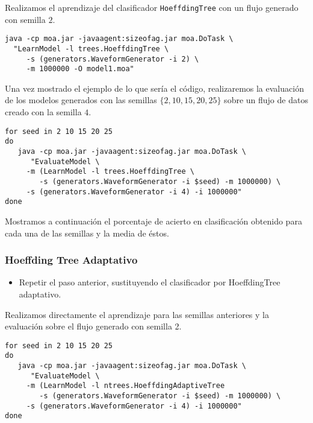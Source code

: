 \documentclass[11pt]{article}
\begin{document}
Realizamos el aprendizaje del clasificador \texttt{HoeffdingTree} con un flujo
generado con semilla \(2\).

\begin{verbatim}
java -cp moa.jar -javaagent:sizeofag.jar moa.DoTask \
  "LearnModel -l trees.HoeffdingTree \
     -s (generators.WaveformGenerator -i 2) \
     -m 1000000 -O model1.moa"
\end{verbatim}



Una vez mostrado el ejemplo de lo que sería el código, realizaremos la
evaluación de los modelos generados con las semillas
\(\{2,10,15,20,25\}\) sobre un flujo de datos creado con la semilla \(4\).

\begin{verbatim}
for seed in 2 10 15 20 25
do
   java -cp moa.jar -javaagent:sizeofag.jar moa.DoTask \
      "EvaluateModel \
	 -m (LearnModel -l trees.HoeffdingTree \
	    -s (generators.WaveformGenerator -i $seed) -m 1000000) \
	 -s (generators.WaveformGenerator -i 4) -i 1000000"
done
\end{verbatim}

Mostramos a continuación el porcentaje de acierto en clasificación
obtenido para cada una de las semillas y la media de éstos.
\subsubsection{Hoeffding Tree Adaptativo}
\label{sec:orgbae41d9}
\begin{itemize}
\item Repetir el paso anterior, sustituyendo el clasificador por
HoeffdingTree adaptativo.
\end{itemize}

Realizamos directamente el aprendizaje para las semillas anteriores y
la evaluación sobre el flujo generado con semilla 2.

\begin{verbatim}
for seed in 2 10 15 20 25
do
   java -cp moa.jar -javaagent:sizeofag.jar moa.DoTask \
      "EvaluateModel \
	 -m (LearnModel -l ntrees.HoeffdingAdaptiveTree
	    -s (generators.WaveformGenerator -i $seed) -m 1000000) \
	 -s (generators.WaveformGenerator -i 4) -i 1000000"
done
\end{verbatim}
\end{document}
